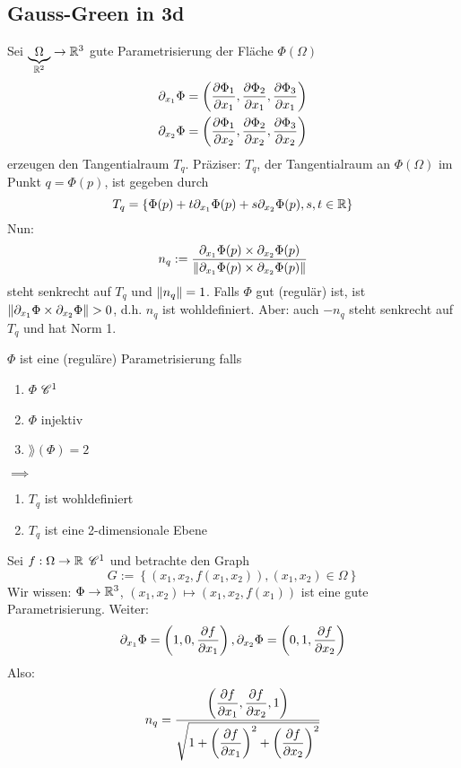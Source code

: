 \subsection{Gauss-Green in 3d}
\begin{Bem}
  Sei $\underbrace{\Omega}_{\mathbb{R}^{2}}\rightarrow\mathbb{R}^3$ gute Parametrisierung der Fläche $\Phi(\Omega)$
  \begin{eqnarray*}
    \partial_{x_1}\Phi=\left( \dfrac{\partial \Phi_1}{\partial x_1}, \dfrac{\partial \Phi_2}{\partial x_1}, \dfrac{\partial \Phi_3}{\partial x_1}\right)\\
    \partial_{x_2}\Phi=\left( \dfrac{\partial \Phi_1}{\partial x_2}, \dfrac{\partial \Phi_2}{\partial x_2}, \dfrac{\partial \Phi_3}{\partial x_2}\right)\\
  \end{eqnarray*}
  erzeugen den Tangentialraum $T_q$.
  Präziser: $T_q$, der Tangentialraum an $\Phi(\Omega)$ im Punkt $q=\Phi(p)$, ist gegeben durch
  \[T_q=\left\{ \Phi(p) + t\partial_{x_1}\Phi(p) + s\partial_{x_2}\Phi(p), s,t\in\mathbb{R}\right\}\]
  Nun:
  \[n_q:=\frac{\partial_{x_1}\Phi(p) \times \partial_{x_2}\Phi(p)}{\left\| \partial_{x_1}\Phi(p) \times \partial_{x_2}\Phi(p) \right\|}\]
  steht senkrecht auf $T_q$ und $\left\| n_q \right\|=1$. Falls $\Phi$ gut (regulär) ist, ist $\Norm{\partial_{x_1}\Phi \times \partial_{x_2}\Phi}>0$, d.h. $n_q$ ist wohldefiniert.
  Aber: auch $-n_q$ steht senkrecht auf $T_q$ und hat Norm 1.
\end{Bem}
\begin{Bem}
  $\Phi$ ist eine (reguläre) Parametrisierung falls
  \begin{enumerate}
    \item $\Phi$ $\mathscr{C}^1$
    \item $\Phi$ injektiv
    \item $\rang(\Phi)=2$
  \end{enumerate}
  $\implies$
  \begin{enumerate}
    \item $T_q$ ist wohldefiniert
    \item $T_q$ ist eine 2-dimensionale Ebene
  \end{enumerate}
\end{Bem}
\begin{Bsp}
  Sei $f:\Omega\rightarrow\mathbb{R}$ $\mathscr{C}^1$ und betrachte den Graph
  \[G:=\left\{ (x_1,x_2, f(x_1,x_2)), (x_1,x_2)\in\Omega \right\}\]
  Wir wissen: $\Phi\rightarrow\mathbb{R}^3$, $(x_1,x_2)\mapsto (x_1,x_2,f(x_1))$ ist eine gute Parametrisierung.
  Weiter:
  \[\partial_{x_1}\Phi=\left( 1,0,\dfrac{\partial f}{\partial x_1} \right), \partial_{x_2}\Phi=\left( 0,1,\dfrac{\partial f}{\partial x_2} \right) \]
  Also:
  \[n_q=\frac{\left(\dfrac{\partial f}{\partial x_1} ,\dfrac{\partial f}{\partial x_2}, 1 \right)}{\sqrt{1+\left( \dfrac{\partial f}{\partial x_1} \right)^2 + \left(\dfrac{\partial f}{\partial x_2}\right)^2}} \]
\end{Bsp}
